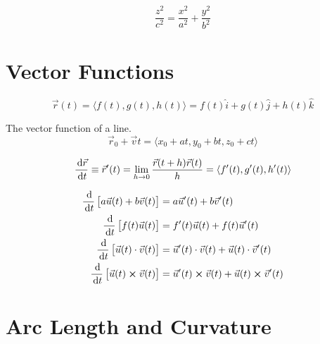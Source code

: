 \begin{example}
	\begin{equation}
		\frac{z^2}{c^2} = \frac{x^2}{a^2} + \frac{y^2}{b^2}
	\end{equation}
\end{example}

\section{Vector Functions}

\begin{definition}
	\begin{equation}
		\vec r(t) = \langle f(t), g(t), h(t) \rangle = f(t) \hat i + g(t) \hat j + h(t) \hat k
	\end{equation}
\end{definition}

\begin{example}
	The vector function of a line.
	\begin{equation}
		\vec r_0 + \vec v t = \langle x_0 + at, y_0 + bt, z_0 + ct \rangle
	\end{equation}
\end{example}

\begin{definition}
	\begin{equation}
		\frac{\D \vec r}{\D t} \equiv \vec r'(t) = \lim_{h \to 0} \frac{\vec r(t + h) \vec r(t)}{h} = \langle f'(t), g'(t), h'(t) \rangle
	\end{equation}
\end{definition}

\begin{definition}
	\begin{align}
		\frac{\D}{\D t} \left[a \vec u(t) + b \vec v(t)\right] &= a \vec u'(t) + b \vec v'(t)\\
		\frac{\D}{\D t} \left[f(t) \vec u(t)\right] &= f'(t) \vec u(t) + f(t) \vec u'(t)\\
		\frac{\D}{\D t} \left[\vec u(t) \cdot \vec v(t)\right] &= \vec u'(t) \cdot \vec v(t) + \vec u(t) \cdot \vec v'(t)\\
		\frac{\D}{\D t} \left[\vec u(t) \cross \vec v (t)\right] &= \vec u'(t) \cross \vec v(t) + \vec u(t) \cross \vec v'(t)
	\end{align}
\end{definition}

\section{Arc Length and Curvature}

